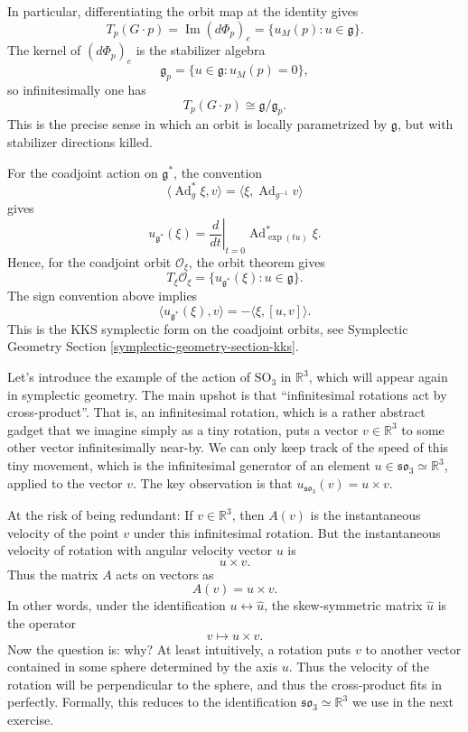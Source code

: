 \medskip\noindent
In particular, differentiating the orbit map
at the identity gives
$$
T_p(G\cdot p)=\operatorname{Im}(d\Phi_p)_e
=\{u_M(p):u\in\mathfrak g\}.
$$
The kernel of $(d\Phi_p)_e$ is the stabilizer
algebra
$$
\mathfrak g_p=
\{u\in\mathfrak g:u_M(p)=0\},
$$
so infinitesimally one has
$$
T_p(G\cdot p)\cong \mathfrak g/\mathfrak g_p.
$$
This is the precise sense in which an orbit
is locally parametrized by $\mathfrak g$, but
with stabilizer directions killed.

\medskip\noindent
For the coadjoint action on $\mathfrak g^*$,
the convention
$$
\langle \operatorname{Ad}^*_g\xi,v\rangle
=
\langle \xi,\operatorname{Ad}_{g^{-1}}v\rangle
$$
gives
$$u_{\mathfrak g^*}(\xi)=
\left.\frac{d}{dt}\right|_{t=0}
\operatorname{Ad}^*_{\exp(tu)}\xi.
$$
Hence, for the coadjoint orbit
$\mathcal O_\xi$, the orbit theorem gives
$$
T_\xi\mathcal O_\xi=
\{u_{\mathfrak g^*}(\xi):u\in\mathfrak g\}.
$$
The sign convention above implies
$$
\langle u_{\mathfrak g^*}(\xi),v\rangle
=
-\langle \xi,[u,v]\rangle.
$$
This is the KKS symplectic form
on the coadjoint orbits,
see Symplectic Geometry Section
\ref{symplectic-geometry-section-kks}.

\medskip\noindent
Let's introduce the example of
the action of $\text{SO}_3$ in
$\mathbb{R}^3$, which will appear
again in symplectic geometry.
The main upshot is that
``infinitesimal rotations act by
cross-product''. That is, an infinitesimal
rotation, which is a rather abstract
gadget that we imagine simply as a tiny
rotation, puts a vector $v \in \mathbb{R}^3$
to some other vector infinitesimally
near-by. We can only keep track of
the speed of this tiny movement,
which is the infinitesimal
generator of an element
$u \in\mathfrak{so}_3 \simeq \mathbb{R}^3$,
applied to the vector $v$.
The key observation is that
$u_{\mathfrak{so}_3}(v)
=u \times v $.

At the risk of being redundant:
If $v\in\mathbb R^3$, then $A(v)$ is the
instantaneous velocity of the point $v$ under
this infinitesimal rotation. But the
instantaneous velocity of rotation with
angular velocity vector $u$ is
$$
u\times v.
$$
Thus the matrix $A$ acts on vectors as
$$
A(v)=u\times v.
$$
In other words, under the identification
$u\leftrightarrow \hat u$, the skew-symmetric
matrix $\hat u$ is the operator
$$
v\mapsto u\times v.
$$
Now the question is: why?
At least intuitively, a rotation
puts $v$ to another vector contained
in some sphere determined by the axis $u$.
Thus the velocity of the rotation
will be perpendicular to the sphere,
and thus the cross-product fits in
perfectly. Formally, this reduces
to the identification 
$\mathfrak{so}_3 \simeq \mathbb{R}^3$
we use
in the next exercise.

